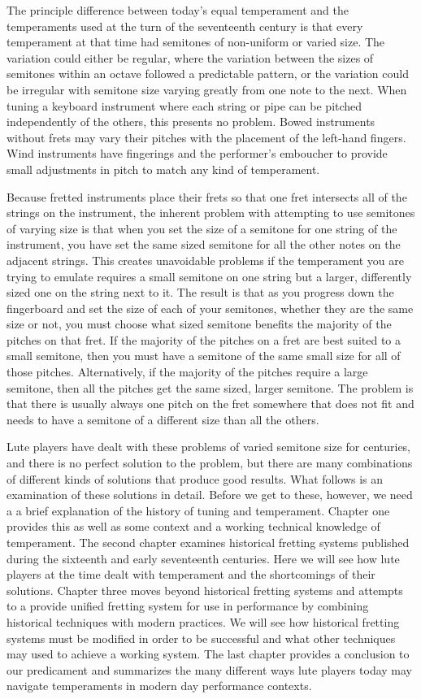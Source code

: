 The principle difference between today's equal temperament and the temperaments used at
the turn of the seventeenth century is that every temperament at that time had
semitones of non-uniform or varied size.  The variation could either be regular, where
the variation between the sizes of semitones within an octave followed a predictable
pattern, or the variation could be irregular with semitone size varying greatly from
one note to the next. When tuning a keyboard instrument where each string or pipe can
be pitched independently of the others, this presents no problem.  Bowed instruments
without frets may vary their pitches with the placement of the left-hand fingers.  Wind
instruments have fingerings and the performer's emboucher to provide small adjustments
in pitch to match any kind of temperament.

Because fretted instruments place their frets so that one fret intersects all of the
strings on the instrument, the inherent problem with attempting to use semitones of
varying size is that when you set the size of a semitone for one string of the
instrument, you have set the same sized semitone for all the other notes on the
adjacent strings. This creates unavoidable problems if the temperament you are trying
to emulate requires a small semitone on one string but a larger, differently sized one
on the string next to it. The result is that as you progress down the fingerboard and
set the size of each of your semitones, whether they are the same size or not, you must
choose what sized semitone benefits the majority of the pitches on that fret. If the
majority of the pitches on a fret are best suited to a small semitone, then you must
have a semitone of the same small size for all of those pitches. Alternatively, if the
majority of the pitches require a large semitone, then all the pitches get the same
sized, larger semitone.  The problem is that there is usually always one pitch on the
fret somewhere that does not fit and needs to have a semitone of a different size than
all the others.

Lute players have dealt with these problems of varied semitone size for centuries, and
there is no perfect solution to the problem, but there are many combinations of
different kinds of solutions that produce good results. What follows is an examination
of these solutions in detail.  Before we get to these, however, we need a a brief
explanation of the history of tuning and temperament. Chapter one provides this as well
as some context and a working technical knowledge of temperament. The second chapter
examines historical fretting systems published during the sixteenth and early
seventeenth centuries. Here we will see how lute players at the time dealt with
temperament and the shortcomings of their solutions. Chapter three moves beyond
historical fretting systems and attempts to a provide unified fretting system for use
in performance by combining historical techniques with modern practices.  We will see
how historical fretting systems must be modified in order to be successful and what
other techniques may used to achieve a working system. The last chapter provides a
conclusion to our predicament and summarizes the many different ways lute players today
may navigate temperaments in modern day performance contexts.
